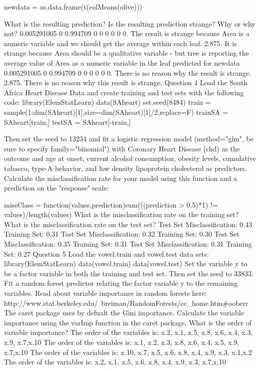 newdata = as.data.frame(t(colMeans(olive)))
 
What is the resulting prediction? Is the resulting prediction strange? Why or why not?
0.005291005 0 0.994709 0 0 0 0 0 0. The result is strange because Area is a numeric variable and we should get the average within each leaf.
2.875. It is strange because Area should be a qualitative variable - but tree is reporting the average value of Area as a numeric variable in the leaf predicted for newdata
0.005291005 0 0.994709 0 0 0 0 0 0. There is no reason why the result is strange.
2.875. There is no reason why this result is strange.
Question 4
Load the South Africa Heart Disease Data and create training and test sets with the following code:
library(ElemStatLearn)
data(SAheart)
set.seed(8484)
train = sample(1:dim(SAheart)[1],size=dim(SAheart)[1]/2,replace=F)
trainSA = SAheart[train,]
testSA = SAheart[-train,]
 
Then set the seed to 13234 and fit a logistic regression model (method="glm", be sure to specify family="binomial") with Coronary Heart Disease (chd) as the outcome and age at onset, current alcohol consumption, obesity levels, cumulative tabacco, type-A behavior, and low density lipoprotein cholesterol as predictors. Calculate the misclassification rate for your model using this function and a prediction on the "response" scale:
 
missClass = function(values,prediction){sum(((prediction > 0.5)*1) != values)/length(values)}
What is the misclassification rate on the training set? What is the misclassification rate on the test set?
Test Set Misclassification: 0.43 
Training Set: 0.31
Test Set Misclassification: 0.32 
Training Set: 0.30
Test Set Misclassification: 0.35 
Training Set: 0.31
Test Set Misclassification: 0.31 
Training Set: 0.27
Question 5
Load the vowel.train and vowel.test data sets:
library(ElemStatLearn)
data(vowel.train)
data(vowel.test) 
Set the variable y to be a factor variable in both the training and test set. Then set the seed to 33833. Fit a random forest predictor relating the factor variable y to the remaining variables. Read about variable importance in random forests here: http://www.stat.berkeley.edu/~breiman/RandomForests/cc_home.htm#ooberr The caret package uses by defualt the Gini importance. Calculate the variable importance using the varImp function in the caret package. What is the order of variable importance?
The order of the variables is:
x.2, x.1, x.5, x.8, x.6, x.4, x.3, x.9, x.7,x.10
 The order of the variables is:
x.1, x.2, x.3, x.8, x.6, x.4, x.5, x.9, x.7,x.10
 The order of the variables is:
x.10, x.7, x.5, x.6, x.8, x.4, x.9, x.3, x.1,x.2
 The order of the variables is:
x.2, x.1, x.5, x.6, x.8, x.4, x.9, x.3, x.7,x.10
